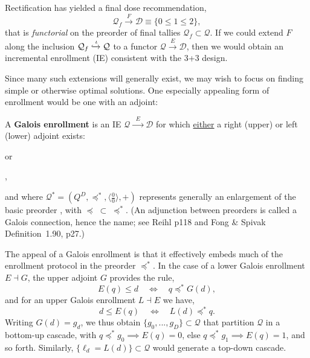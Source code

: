 \documentclass{article}
\newcommand{\IE}{\ensuremath{\mathcal{Q} \xrightarrow{\;\;E\;\;} \mathcal{D}}}
\begin{document}
Rectification has yielded a final dose recommendation,
$$
\mathcal{Q}_f \xrightarrow{F} \mathcal{D} \equiv \{0 \leq 1 \leq 2\},
$$
that is {\em functorial} on the preorder of final tallies $\mathcal{Q}_f \subset \mathcal{Q}$.  If we could extend $F$ along the inclusion $\mathcal{Q}_f \xhookrightarrow{\iota} \mathcal{Q}$ to a functor $\mathcal{Q} \xrightarrow{E} \mathcal{D}$, then we would obtain an incremental enrollment (IE) consistent with the \mbox{3+3} design.

\begin{center}
\end{center}

Since many such extensions will generally exist, we may wish to focus on finding simple or otherwise optimal solutions.  One especially appealing form of enrollment would be one with an adjoint:

\begin{defn}
  A \textbf{Galois enrollment} is an IE $\IE$ for which \underline{either} a right (upper) or left (lower) adjoint exists:
  \begin{center}
  \end{center}
  or
  \begin{center}
    ,
  \end{center}
  and where $\mathcal{Q}^* = (Q^D,\preceq^*,\langle\frac{0}{0}\rangle,+)$ represents generally an enlargement of the basic preorder , with $\preceq \;\subset\; \preceq^*$.  (An adjunction between preorders is called a Galois connection, hence the name; see Reihl p118 and Fong \& Spivak Definition~1.90, p27.)
\end{defn}

The appeal of a Galois enrollment is that it effectively embeds much of the enrollment protocol in the preorder $\preceq^*$.  In the case of a lower Galois enrollment $E \dashv G$, the upper adjoint $G$ provides the rule,
$$
E(q) \leq d \quad \iff \quad q \preceq^*\! G(d),
$$
and for an upper Galois enrollment $L \dashv E$ we have,
$$
d \leq E(q) \quad \iff \quad L(d) \preceq^*\! q.
$$
Writing $G(d) = g_d$, we thus obtain $\{g_0,...,g_D\} \subset \mathcal{Q}$ that partition $\mathcal{Q}$ in a bottom-up cascade, with $q \preceq^*\! g_0 \implies E(q)=0$, else $q \preceq^*\! g_1 \implies E(q)=1$, and so forth.  Similarly, $\{\ell_d = L(d)\} \subset \mathcal{Q}$ would generate a top-down cascade.
\end{document}
